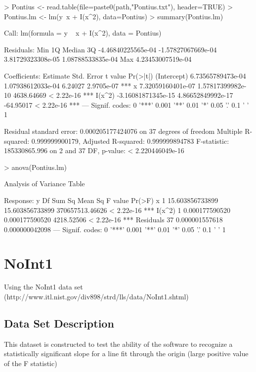\documentclass[10pt]{article}
\begin{document}
\begin{Schunk}
\begin{Sinput}
> Pontius <- read.table(file=paste0(path,"Pontius.txt"), header=TRUE)
> Pontius.lm <- lm(y~x + I(x^2), data=Pontius)
> summary(Pontius.lm)
\end{Sinput}
\begin{Soutput}
Call:
lm(formula = y ~ x + I(x^2), data = Pontius)

Residuals:
               Min                 1Q             Median                 3Q 
-4.46840225565e-04 -1.57827067669e-04  3.81729323308e-05  1.08788533835e-04 
               Max 
 4.23453007519e-04 

Coefficients:
                      Estimate         Std. Error    t value   Pr(>|t|)    
(Intercept)  6.73565789473e-04  1.07938612033e-04    6.24027 2.9705e-07 ***
x            7.32059160401e-07  1.57817399982e-10 4638.64669 < 2.22e-16 ***
I(x^2)      -3.16081871345e-15  4.86652849992e-17  -64.95017 < 2.22e-16 ***
---
Signif. codes:  0 '***' 0.001 '**' 0.01 '*' 0.05 '.' 0.1 ' ' 1

Residual standard error: 0.000205177424076 on 37 degrees of freedom
Multiple R-squared:  0.999999900179,	Adjusted R-squared:  0.999999894783 
F-statistic: 185330865.996 on 2 and 37 DF,  p-value: < 2.220446049e-16
\end{Soutput}
\begin{Sinput}
> anova(Pontius.lm)
\end{Sinput}
\begin{Soutput}
Analysis of Variance Table

Response: y
          Df          Sum Sq         Mean Sq         F value     Pr(>F)    
x          1 15.603856733899 15.603856733899 370657513.46626 < 2.22e-16 ***
I(x^2)     1  0.000177590520  0.000177590520      4218.52506 < 2.22e-16 ***
Residuals 37  0.000001557618  0.000000042098                               
---
Signif. codes:  0 '***' 0.001 '**' 0.01 '*' 0.05 '.' 0.1 ' ' 1
\end{Soutput}
\end{Schunk}

\section{NoInt1}
Using the NoInt1 data set (http://www.itl.nist.gov/div898/strd/lls/data/NoInt1.shtml)

\subsection*{Data Set Description}
This dataset is constructed to test the ability of the software to recognize a 
statistically significant slope for a line fit through the origin (large positive 
value of the F statistic)
\end{document}

